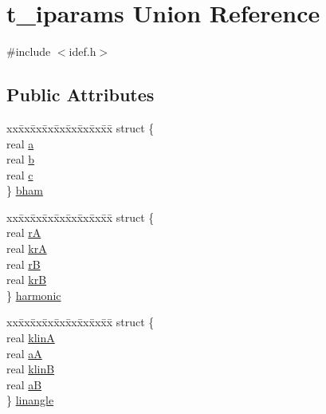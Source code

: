 \hypertarget{uniont__iparams}{\section{t\-\_\-iparams \-Union \-Reference}
\label{uniont__iparams}
}


{\ttfamily \#include $<$idef.\-h$>$}

\subsection*{\-Public \-Attributes}
\begin{DoxyCompactItemize}
\item 
\begin{tabbing}
xx\=xx\=xx\=xx\=xx\=xx\=xx\=xx\=xx\=\kill
struct \{\\
\>real \hyperlink{uniont__iparams_a070fd67041cc597a6c1ec5efeee18969}{a}\\
\>real \hyperlink{uniont__iparams_aecf26369e3ec0909a09fe8be715e3a0e}{b}\\
\>real \hyperlink{uniont__iparams_a6f12f82807f6b417c8982bbb5a27af83}{c}\\
\} \hyperlink{uniont__iparams_af6b5060342ebac43a4922c1c6543745a}{bham}\\

\end{tabbing}\item 
\begin{tabbing}
xx\=xx\=xx\=xx\=xx\=xx\=xx\=xx\=xx\=\kill
struct \{\\
\>real \hyperlink{uniont__iparams_a140d0cfa7716976087a09c992fce9826}{rA}\\
\>real \hyperlink{uniont__iparams_aae31dcba1c5001352979988bca268bd0}{krA}\\
\>real \hyperlink{uniont__iparams_a201b81e15b8da67bf64b6fa4634df60d}{rB}\\
\>real \hyperlink{uniont__iparams_a047f6ac20bbfac244cb0f5c639a6b3eb}{krB}\\
\} \hyperlink{uniont__iparams_a7fa11ef80b05dc45b150d43a27abf9d2}{harmonic}\\

\end{tabbing}\item 
\begin{tabbing}
xx\=xx\=xx\=xx\=xx\=xx\=xx\=xx\=xx\=\kill
struct \{\\
\>real \hyperlink{uniont__iparams_a7a5fa9928ee64a7094141cdf333b66c8}{klinA}\\
\>real \hyperlink{uniont__iparams_a3fe9cc5faaa995f6dc9e3ecb171cde5c}{aA}\\
\>real \hyperlink{uniont__iparams_aabc927d2573a0482e6767d7123ec8e2e}{klinB}\\
\>real \hyperlink{uniont__iparams_ad81a551a8c0c84cb54663e7c6052bf59}{aB}\\
\} \hyperlink{uniont__iparams_ae388ca5f63fc51a4d2704154fad81db4}{linangle}\\


\end{tabbing}
\end{DoxyCompactItemize}

